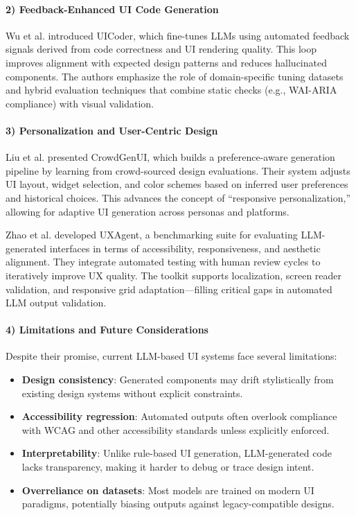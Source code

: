 \documentclass[12pt]{article}
\begin{document}
\paragraph{2) Feedback-Enhanced UI Code Generation}

Wu et al. \cite{wu2024uicoder} introduced UICoder, which fine-tunes LLMs using automated feedback signals derived from code correctness and UI rendering quality. This loop improves alignment with expected design patterns and reduces hallucinated components. The authors emphasize the role of domain-specific tuning datasets and hybrid evaluation techniques that combine static checks (e.g., WAI-ARIA compliance) with visual validation.

\paragraph{3) Personalization and User-Centric Design}

Liu et al. \cite{liu2024crowdgenui} presented CrowdGenUI, which builds a preference-aware generation pipeline by learning from crowd-sourced design evaluations. Their system adjusts UI layout, widget selection, and color schemes based on inferred user preferences and historical choices. This advances the concept of “responsive personalization,” allowing for adaptive UI generation across personas and platforms.

Zhao et al. \cite{zhao2024uxagent} developed UXAgent, a benchmarking suite for evaluating LLM-generated interfaces in terms of accessibility, responsiveness, and aesthetic alignment. They integrate automated testing with human review cycles to iteratively improve UX quality. The toolkit supports localization, screen reader validation, and responsive grid adaptation—filling critical gaps in automated LLM output validation.

\paragraph{4) Limitations and Future Considerations}

Despite their promise, current LLM-based UI systems face several limitations:

\begin{itemize}
    \item \textbf{Design consistency}: Generated components may drift stylistically from existing design systems without explicit constraints.
    \item \textbf{Accessibility regression}: Automated outputs often overlook compliance with WCAG and other accessibility standards unless explicitly enforced.
    \item \textbf{Interpretability}: Unlike rule-based UI generation, LLM-generated code lacks transparency, making it harder to debug or trace design intent.
    \item \textbf{Overreliance on datasets}: Most models are trained on modern UI paradigms, potentially biasing outputs against legacy-compatible designs.
\end{itemize}
\end{document}
